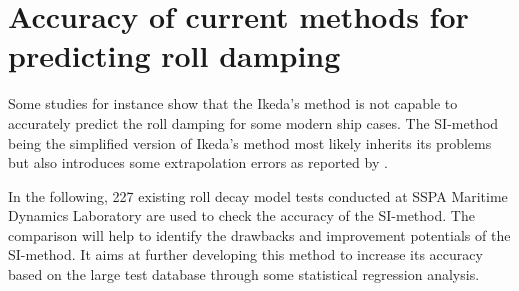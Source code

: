 \section{Accuracy of current methods for predicting roll damping}
\label{se:accuracy_SI_method}
Some studies for instance \parencite{soder_assessment_2019} show that the Ikeda's method is not capable to accurately predict the roll damping for some modern ship cases. The SI-method being the simplified version of Ikeda's method most likely inherits its problems but also introduces some extrapolation errors as reported by \parencite{rudakovic_application_2017}. 

In the following, 227 existing roll decay model tests conducted at SSPA Maritime Dynamics Laboratory are used to check the accuracy of the SI-method. The comparison will help to identify the drawbacks and improvement potentials of the SI-method. It aims at further developing this method to increase its accuracy based on the large test database through some statistical regression analysis.     


